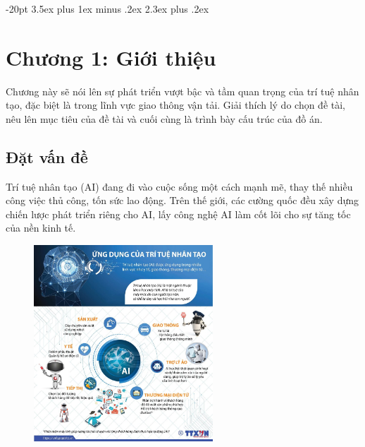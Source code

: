 \documentclass[14pt,oneside,a4paper]{extreport}
\begin{document}

\pagebreak


\pagebreak


\pagebreak


\pagebreak

\normalsize
\tableofcontents{}

\large
\makeatletter
\renewcommand\thesection{}
\renewcommand\thesubsection{\arabic{section}.\arabic{subsection}.}
\renewcommand\thesubsubsection{\thesubsection\arabic{subsubsection}.}
\makeatother

\titlespacing{\section}
{-20pt}%
{3.5ex plus 1ex minus .2ex}%
{2.3ex plus .2ex}%

\section{Chương 1: Giới thiệu}
Chương này sẽ nói lên sự phát triển vượt bậc và tầm quan trọng của trí tuệ nhân tạo, đặc biệt là trong lĩnh vực giao thông vận tải. Giải thích lý do chọn đề tài, nêu lên mục tiêu của đề tài và cuối cùng là trình bày cấu trúc của đồ án.
\subsection{Đặt vấn đề}
Trí tuệ nhân tạo (AI) đang đi vào cuộc sống một cách mạnh mẽ, thay thế nhiều công việc thủ công, tốn sức lao động. Trên thế giới, các cường quốc đều xây dựng chiến lược phát triển riêng cho AI, lấy công nghệ AI làm cốt lõi cho sự tăng tốc của nền kinh tế. 

\begin{figure}[h]
	\includegraphics[width=0.6\textwidth]{image1.jpg}
	\centering
\end{figure}
\end{document}
